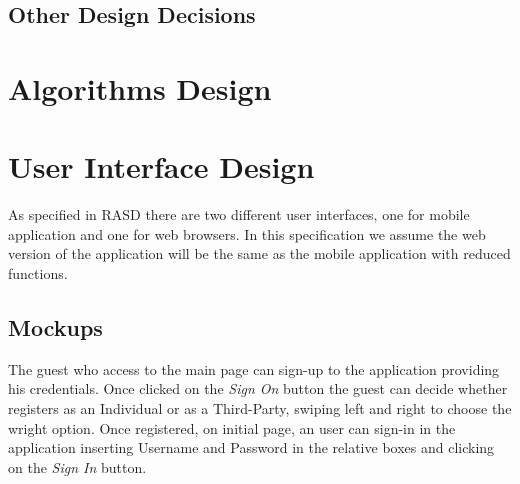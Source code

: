 \documentclass[a4paper]{article}
\begin{document}
\subsection{Other Design Decisions}

\newpage
\section{Algorithms Design}

\newpage
\section{User Interface Design}
As specified in RASD there are two different user interfaces, one for mobile application and one for web browsers. In this specification we assume the web version of the application will be the same as the mobile application with reduced functions.

\subsection{Mockups}
The guest who access to the main page can sign-up to the application providing his credentials. Once clicked on the \textit{Sign On} button the guest can decide whether registers as an Individual or as a Third-Party, swiping left and right to choose the wright option. Once registered, on initial page, an user can sign-in in the application inserting Username and Password in the relative boxes and clicking on the \textit{Sign In} button. 
\end{document}
